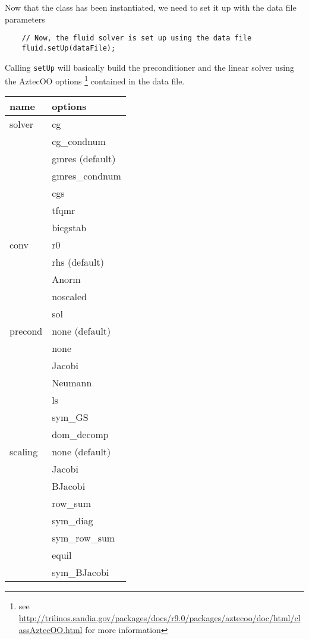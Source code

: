 Now that the class has been instantiated, we need to set it up with the data file parameters

\begin{verbatim}
    // Now, the fluid solver is set up using the data file
    fluid.setUp(dataFile);
\end{verbatim}

Calling \verb|setUp|
will basically build the preconditioner and the linear solver using the AztecOO 
options \footnote{see \url{http://trilinos.sandia.gov/packages/docs/r9.0/packages/aztecoo/doc/html/classAztecOO.html} for more information}
contained in the data file.

\begin{table}
\begin{center}
\begin{tabular}{|l|l|}
\hline
name & options\\
\hline \hline
solver & cg \\
& cg\_condnum\\
& gmres (default)\\
& gmres\_condnum\\
& cgs\\
& tfqmr\\
& bicgstab\\
\hline
conv & r0\\
& rhs (default) \\
& Anorm  \\
& noscaled  \\
& sol \\
\hline

precond & none (default) \\
& none \\
&Jacobi \\
&Neumann \\
&ls \\
&sym\_GS \\
&dom\_decomp \\
\hline

scaling & none (default) \\
&    Jacobi \\
&    BJacobi \\
&    row\_sum \\
&    sym\_diag \\
&    sym\_row\_sum \\
&    equil \\
&    sym\_BJacobi \\

\hline


\end{tabular}
\end{center}
\end{table}
